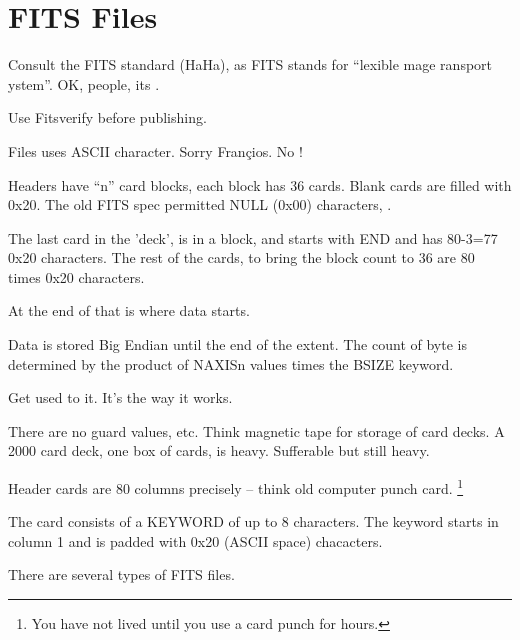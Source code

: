 \section{FITS Files} \label{sec:FITSFiles}

Consult the FITS standard (HaHa), as FITS stands for ``lexible
mage ransport ystem''.  OK, people, its
.

Use Fitsverify \cite{fitsverify-1} before publishing.

Files uses ASCII character. Sorry Fran\c{c}ios. No !

Headers have ``n'' card blocks, each block has 36 cards. Blank cards
are filled with 0x20. The old FITS spec permitted NULL (0x00)
characters, .

The last card in the 'deck', is in a block, and starts with END and
has 80-3=77 0x20 characters.  The rest of the cards, to bring the
block count to 36 are 80 times 0x20 characters.

At the end of that is where data starts.

Data is stored Big Endian until the end of the extent. The count of byte
is determined by the product of NAXISn values times the BSIZE keyword.

Get used to it. It's the way it works.

There are no guard values, etc. Think magnetic tape for storage of card decks.
A 2000 card deck, one box of cards, is heavy. Sufferable but still heavy.

Header cards are 80 columns precisely -- think old computer punch card. \footnote{You have
not lived until you use a card punch for hours.}

The card consists of a KEYWORD of up to 8 characters. The keyword starts in column
1 and is padded with 0x20 (ASCII space) chacacters.



There are several types of FITS files.

